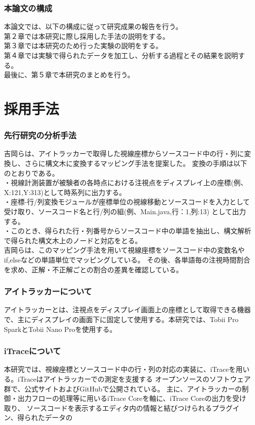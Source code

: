 \documentclass[paper=a4paper,fontsize=11pt]{jlreq}
\begin{document}
  \section{本論文の構成}
    本論文では、以下の構成に従って研究成果の報告を行う。\\
    第２章では本研究に際し採用した手法の説明をする。\\
    第３章では本研究のため行った実験の説明をする。\\
    第４章では実験で得られたデータを加工し、分析する過程とその結果を説明する。\\
    最後に、第５章で本研究のまとめを行う。

\clearpage

\part{採用手法}
  \section{先行研究の分析手法}
    吉岡らは、アイトラッカーで取得した視線座標からソースコード中の行・列に変換し、さらに構文木に変換するマッピング手法を提案した\cite{meiji2021}。
    変換の手順は以下のとおりである。\\
    ・視線計測装置が被験者の各時点における注視点をディスプレイ上の座標(例、X:121,Y:313)として時系列に出力する。\\
    ・座標-行/列変換モジュールが座標単位の視線移動とソースコードを入力として受け取り、ソースコード名と行/列の組(例、Main.java,行：1,列:13)
    として出力する。\\
    ・このとき、得られた行・列番号からソースコード中の単語を抽出し、構文解析で得られた構文木上のノードと対応をとる。\\
    
    吉岡らは、このマッピング手法を用いて視線座標をソースコード中の変数名やif,elseなどの単語単位でマッピングしている。
    その後、各単語毎の注視時間割合を求め、正解・不正解ごとの割合の差異を確認している。

  \section{アイトラッカーについて}
    アイトラッカーとは、注視点をディスプレイ画面上の座標として取得できる機器で、主にディスプレイの画面下に固定して使用する。本研究では、Tobii Pro Spark\cite{spark}とTobii Nano Pro\cite{nano}を使用する。


  \section{iTraceについて}
    本研究では、視線座標とソースコード中の行・列の対応の実装に、iTrace\cite{itrace}を用いる。iTraceはアイトラッカーでの測定を支援する
    オープンソースのソフトウェア群で、公式サイトおよびGitHubで公開されている。
    主に、アイトラッカーの制御・出力フローの処理等に用いるiTrace Coreを軸に、iTrace Coreの出力を受け取り、
    ソースコードを表示するエディタ内の情報と結びつけられるプラグイン、得られたデータの
\end{document}
